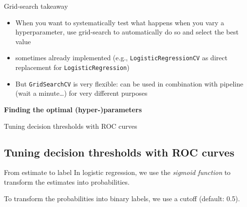 \documentclass{beamer}
\begin{document}
\begin{frame}{Grid-search takeaway}
\begin{itemize}[<+->]
\item When you want to systematically test what happens when you vary a hyperparameter, use grid-search to automatically do so and select the best value
\item sometimes already implemented (e.g., \texttt{LogisticRegressionCV} as direct replacement for \texttt{LogisticRegression})
\item But \texttt{GridSearchCV} is very flexible: can be used in combination with pipeline (wait a minute\ldots) for very different purposes
\end{itemize}


\end{frame}



\begin{frame}[plain]
\textbf{Finding the optimal (hyper-)parameters}

Tuning decision thresholds with ROC curves
\end{frame}

\subsection{Tuning decision thresholds with ROC curves}

\begin{frame}{From estimate to label}
In logistic regression, we use the \textit{sigmoid function} to transform the estimates into probabilities.

To transform the probabilities into binary labels, we use a cutoff (default: 0.5).
\end{frame}
\end{document}
